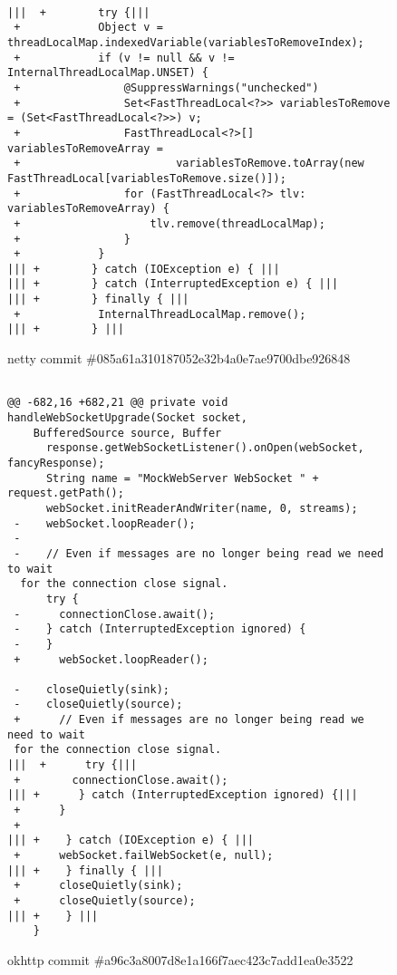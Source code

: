 \begin{figure*}
\begin{lstlisting}[moredelim={[is][\color{red}]{|||}{|||}}]

|||  +        try {||| 
 +            Object v = threadLocalMap.indexedVariable(variablesToRemoveIndex);
 +            if (v != null && v != InternalThreadLocalMap.UNSET) {
 +                @SuppressWarnings("unchecked")
 +                Set<FastThreadLocal<?>> variablesToRemove = (Set<FastThreadLocal<?>>) v;
 +                FastThreadLocal<?>[] variablesToRemoveArray =
 +                        variablesToRemove.toArray(new FastThreadLocal[variablesToRemove.size()]);
 +                for (FastThreadLocal<?> tlv: variablesToRemoveArray) {
 +                    tlv.remove(threadLocalMap);
 +                }
 +            }
||| +        } catch (IOException e) { |||
||| +        } catch (InterruptedException e) { |||
||| +        } finally { ||| 
 +            InternalThreadLocalMap.remove();
||| +        } |||
 \end{lstlisting}
\caption{netty commit \#085a61a310187052e32b4a0e7ae9700dbe926848\label{fig:thread1}}
\end{figure*}


\begin{figure*}
\begin{lstlisting}[moredelim={[is][\color{red}]{|||}{|||}}]

@@ -682,16 +682,21 @@ private void handleWebSocketUpgrade(Socket socket, 
    BufferedSource source, Buffer
      response.getWebSocketListener().onOpen(webSocket, fancyResponse);
      String name = "MockWebServer WebSocket " + request.getPath();
      webSocket.initReaderAndWriter(name, 0, streams);
 -    webSocket.loopReader();
 -
 -    // Even if messages are no longer being read we need to wait
  for the connection close signal.
      try {
 -      connectionClose.await();
 -    } catch (InterruptedException ignored) {
 -    }
 +      webSocket.loopReader();
  
 -    closeQuietly(sink);
 -    closeQuietly(source);
 +      // Even if messages are no longer being read we need to wait 
 for the connection close signal.
|||  +      try {||| 
 +        connectionClose.await();
||| +      } catch (InterruptedException ignored) {|||
 +      }
 +
||| +    } catch (IOException e) { |||
 +      webSocket.failWebSocket(e, null); 
||| +    } finally { ||| 
 +      closeQuietly(sink);
 +      closeQuietly(source);
||| +    } |||
    }
\end{lstlisting}
\caption{okhttp commit \#a96c3a8007d8e1a166f7aec423c7add1ea0e3522\label{fig:thread2}}
\end{figure*}


